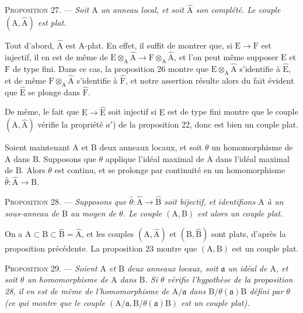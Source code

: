 \textsc{Proposition} 27. --- \emph{Soit $\mathrm{A}$ un anneau local, et soit $\hat{\mathrm{A}}$ son complété. Le couple $(\mathrm{A}, \hat{\mathrm{A}})$ est plat.}

Tout d'abord, $\hat{\mathrm{A}}$ est $\mathrm{A}$-plat. En effet, il suffit de montrer que, si $\mathrm{E} \to \mathrm{F}$ est injectif, il en est de même de $\mathrm{E} \otimes_\mathrm{A} \hat{\mathrm{A}} \to \mathrm{F} \otimes_\mathrm{A} \hat{\mathrm{A}}$, et l'on peut même supposer $\mathrm{E}$ et $\mathrm{F}$ de type fini. Dans ce cas, la proposition 26 montre que $\mathrm{E} \otimes_\mathrm{A} \hat{\mathrm{A}}$ s'identifie à $\hat{\mathrm{E}}$, et de même $\mathrm{F} \otimes_\mathrm{A} \hat{\mathrm{A}}$ s'identifie à $\hat{\mathrm{F}}$, et notre assertion résulte alors du fait évident que $\hat{\mathrm{E}}$ se plonge dans $\hat{\mathrm{F}}$.

De même, le fait que $\mathrm{E} \to \hat{\mathrm{E}}$ soit injectif si $\mathrm{E}$ est de type fini montre que le couple $(\mathrm{A}, \hat{\mathrm{A}})$ vérifie la propriété $a'$) de la proposition 22, donc est bien un couple plat.

Soient maintenant $\mathrm{A}$ et $\mathrm{B}$ deux anneaux locaux, et soit $\theta$ un homomorphisme de $\mathrm{A}$ dans $\mathrm{B}$. Supposons que $\theta$ applique l'idéal %
maximal de $\mathrm{A}$ dans l'idéal maximal de $\mathrm{B}$. Alors $\theta$ est continu, et se prolonge par continuité en un homomorphisme $\hat{\theta} : \hat{\mathrm{A}} \to \hat{\mathrm{B}}$.

\textsc{Proposition} 28. --- \emph{Supposons que $\hat{\theta} : \hat{\mathrm{A}} \to \hat{\mathrm{B}}$ soit bijectif, et identifions $\mathrm{A}$ à un sous-anneau de $\mathrm{B}$ au moyen de $\theta$. Le couple $(\mathrm{A}, \mathrm{B})$ est alors un couple plat.}

On a $\mathrm{A} \subset \mathrm{B} \subset \hat{\mathrm{B}} = \hat{\mathrm{A}}$, et les couples $(\mathrm{A}, \hat{\mathrm{A}})$ et $(\mathrm{B}, \hat{\mathrm{B}})$ sont plats, d'après la proposition précédente. La proposition 23 montre que $(\mathrm{A}, \mathrm{B})$ est un couple plat.

\textsc{Proposition} 29. --- \emph{Soient $\mathrm{A}$ et $\mathrm{B}$ deux anneaux locaux, soit $\mathfrak{a}$ un idéal de $\mathrm{A}$, et soit $\theta$ un homomorphisme de $\mathrm{A}$ dans $\mathrm{B}$. Si $\theta$ vérifie l'hypothèse de la proposition 28, il en est de même de l'homomorphisme de $\mathrm{A}/\mathfrak{a}$ dans $\mathrm{B}/\theta(\mathfrak{a})\mathrm{B}$ défini par $\theta$ (ce qui montre que le couple $(\mathrm{A}/\mathfrak{a}, \mathrm{B}/\theta(\mathfrak{a})\mathrm{B})$ est un couple plat).}

